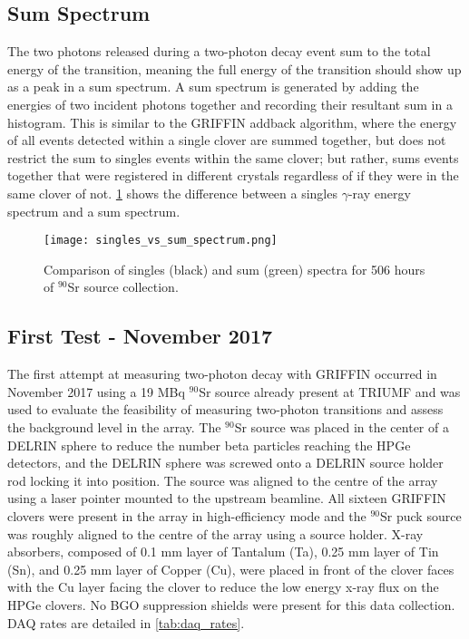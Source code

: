 \documentclass[cnatzke_thesis_proposal.tex]{subfiles}
\begin{document}
\subsection{Sum Spectrum}
\label{sec:sum_spectrum}

The two photons released during a two-photon decay event sum to the total energy of the transition, meaning the full energy of the transition should show up as a peak in a sum spectrum. 
A sum spectrum is generated by adding the energies of two incident photons together and recording their resultant sum in a histogram.
This is similar to the GRIFFIN addback algorithm, where the energy of all events detected within a single clover are summed together, but does not restrict the sum to singles events within the same clover; but rather, sums events together that were registered in different crystals regardless of if they were in the same clover of not. 
\ref{fig:singles_vs_sum_spectrum} shows the difference between a singles $\gamma$-ray energy spectrum and a sum spectrum.

\begin{figure}[htbp]
  \centering
  \texttt{[image: singles\_vs\_sum\_spectrum.png]}
  \caption{Comparison of singles (black) and sum (green) spectra for 506 hours of $^{90}$Sr source collection.}
  \label{fig:singles_vs_sum_spectrum}
\end{figure}

\subsection{First Test - November 2017}
The first attempt at measuring two-photon decay with GRIFFIN occurred in November 2017 using a 19 MBq $^{90}$Sr source already present at TRIUMF and was used to evaluate the feasibility of measuring two-photon transitions and assess the background level in the array.
The $^{90}$Sr source was placed in the center of a DELRIN sphere to reduce the number beta particles reaching the HPGe detectors, and the DELRIN sphere was screwed onto a DELRIN source holder rod locking it into position.
The source was aligned to the centre of the array using a laser pointer mounted to the upstream beamline.
All sixteen GRIFFIN clovers were present in the array in high-efficiency mode and the $^{90}$Sr puck source was roughly aligned to the centre of the array using a source holder.
X-ray absorbers, composed of 0.1 mm layer of Tantalum (Ta), 0.25 mm layer of Tin (Sn), and 0.25 mm layer of Copper (Cu), were placed in front of the clover faces with the Cu layer facing the clover to reduce the low energy x-ray flux on the HPGe clovers.
No BGO suppression shields were present for this data collection. 
DAQ rates are detailed in \ref{tab:daq_rates}.
\end{document}
